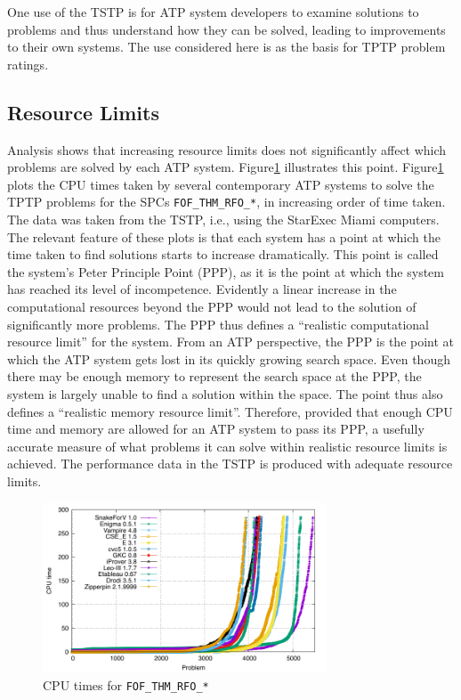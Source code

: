 \documentclass[runningheads]{llncs}
\begin{document}
One use of the TSTP is for ATP system developers to examine solutions to problems and thus 
understand how they can be solved, leading to improvements to their own systems. 
The use considered here is as the basis for TPTP problem ratings.

\subsection{Resource Limits}
\label{ResourceLimits}

Analysis shows that increasing resource limits does not significantly affect which problems 
are solved by each ATP system. 
Figure\ref{PPPPlot} illustrates this point.
Figure\ref{PPPPlot} plots the CPU times taken by several contemporary ATP systems to solve the 
TPTP problems for the SPCs {\tt FOF\_THM\_RFO\_*}, in increasing order of time taken. 
The data was taken from the TSTP, i.e., using the StarExec Miami computers.
The relevant feature of these plots is that each system has a point at which the time taken to 
find solutions starts to increase dramatically. 
This point is called the system's Peter Principle \cite{PH69} Point (PPP), as it is the point at 
which the system has reached its level of incompetence. 
Evidently a linear increase in the computational resources beyond the PPP would not lead to the 
solution of significantly more problems. 
The PPP thus defines a ``realistic computational resource limit'' for the system. 
From an ATP perspective, the PPP is the point at which the ATP system gets lost in its quickly 
growing search space. 
Even though there may be enough memory to represent the search space at the PPP, the system is 
largely unable to find a solution within the space. 
The point thus also defines a ``realistic memory resource limit''. 
Therefore, provided that enough CPU time and memory are allowed for an ATP system to pass its 
PPP, a usefully accurate measure of what problems it can solve within realistic resource limits 
is achieved.
The performance data in the TSTP is produced with adequate resource limits.

\begin{figure}[ht!]
\begin{center}
\includegraphics[width=0.75\textwidth]{Plots/FOF_THM_RFO_PPP/FOF_THM_RFO_PPP}
\vspace*{-1em}
\caption{CPU times for {\tt FOF\_THM\_RFO\_*}}
\label{PPPPlot}
\end{center}
\end{figure}
\end{document}
